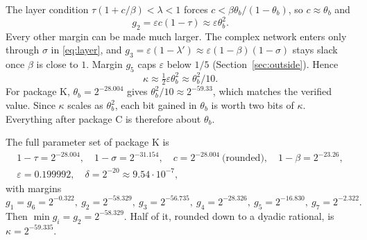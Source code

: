 The layer condition $\tau(1+c/\beta) < \lambda < 1$ forces $c < \beta\theta_b/(1-\theta_b)$, so $c \approx \theta_b$ and
\[
g_2 = \varepsilon c(1-\tau) \approx \varepsilon\theta_b^2 .
\]
Every other margin can be made much larger. The complex network enters only through $\sigma$ in \eqref{eq:layer}, and $g_3 = \varepsilon(1-\lambda') \approx \varepsilon(1-\beta)(1-\sigma)$ stays slack once $\beta$ is close to $1$. Margin $g_5$ caps $\varepsilon$ below $1/5$ (Section~\ref{sec:outside}). Hence
\[
\kappa \approx \tfrac12\varepsilon\theta_b^2 \approx \theta_b^2/10 .
\]
For package K, $\theta_b = 2^{-28.004}$ gives $\theta_b^2/10 \approx 2^{-59.33}$, which matches the verified value. Since $\kappa$ scales as $\theta_b^2$, each bit gained in $\theta_b$ is worth two bits of $\kappa$. Everything after package C is therefore about $\theta_b$.

The full parameter set of package K is
\begin{gather*}
1-\tau = 2^{-28.004},\quad 1-\sigma = 2^{-31.154},\quad c = 2^{-28.004}\ \text{(rounded)},\quad 1-\beta = 2^{-23.26},\\
\varepsilon = 0.199992,\quad \delta = 2^{-20} \approx 9.54\cdot 10^{-7},
\end{gather*}
with margins
\[
g_1 = g_6 = 2^{-0.322},\ g_2 = 2^{-58.329},\ g_3 = 2^{-56.735},\ g_4 = 2^{-28.326},\ g_5 = 2^{-16.830},\ g_7 = 2^{-2.322}.
\]
Then $\min g_i = g_2 = 2^{-58.329}$. Half of it, rounded down to a dyadic rational, is $\kappa = 2^{-59.335}$.
